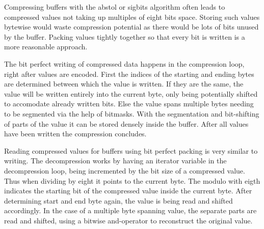 \documentclass[
	12pt,
	a4paper,
	BCOR10mm,
	DIV14,
	headsepline,
]{scrreprt}
\begin{document}
Compressing buffers with the abstol or sigbits algorithm often leads to
compressed values not taking up multiples of eight bits space. Storing such
values bytewise would waste compression potential as there would be lots of
bits unused by the buffer. Packing values tightly together so that every bit
is written is a more reasonable approach. \par
The bit perfect writing of compressed data happens in the compression loop,
right after values are encoded. First the indices of the starting and ending
bytes are determined between which the value is written. If they are the same, the
value will be written entirely into the current byte, only being potentially
shifted to accomodate already written bits. Else the value spans multiple
bytes needing to be segmented via the help of bitmasks. With the segmentation
and bit-shifting of parts of the value it can be stored densely inside the
buffer. After all values have been written the compression concludes. \par
Reading compressed values for buffers using bit perfect packing is very
similar to writing. The decompression works by having an iterator variable in
the decompression loop, being incremented by the bit size of a compressed value.
Thus when dividing by eight it points to the current byte. The modulo with
eigth indicates the starting bit of the compressed value inside the current
byte. After determining start and end byte again, the value is being read and
shifted accordingly. In the case of a multiple byte spanning value, the separate
parts are read and shifted, using a bitwise and-operator to reconstruct the
original value.
\end{document}

